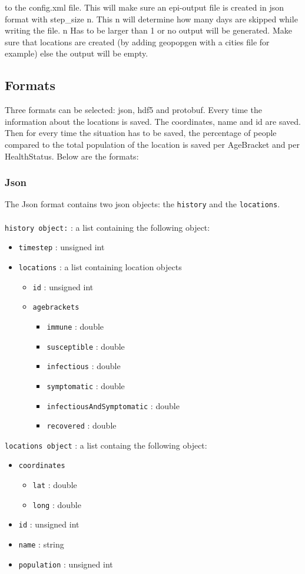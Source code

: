 to the config.xml file. This will make sure an epi-output file is created in json format with step\_size n. This n will determine how many days are skipped while writing the file. n Has to be larger than 1 or no output will be generated. Make sure that locations are created (by adding geopopgen with a cities file for example) else the output will be empty. 

\subsection{Formats}
Three formats can be selected: json, hdf5 and protobuf. Every time the information about the locations is saved. The coordinates, name and id are saved. Then for every time the situation has to be saved, the percentage of people compared to the total population of the location is saved per  AgeBracket and per HealthStatus. Below are the formats:
\subsubsection{Json}
The Json format contains two json objects: the \texttt{history} and the \texttt{locations}.
\\\\
\texttt{history object:} : a list containing the following object:
\begin{itemize}
\item \texttt{timestep} : unsigned int
\item \texttt{locations} : a list containing location objects
\begin{itemize}
\item \texttt{id} : unsigned int
\item \texttt{agebrackets}
\begin{itemize}
\item \texttt{immune} 		: double
\item \texttt{susceptible} 	: double
\item \texttt{infectious} 	: double
\item \texttt{symptomatic} 	: double
\item \texttt{infectiousAndSymptomatic} 	: double
\item \texttt{recovered} 	: double
\end{itemize}
\end{itemize}
\end{itemize}

\texttt{locations object} : a list containg the following object:
\begin{itemize}
\item \texttt{coordinates}
\begin{itemize}
\item \texttt{lat} : double
\item \texttt{long} : double
\end{itemize}
\item \texttt{id} : unsigned int
\item \texttt{name} : string
\item \texttt{population} : unsigned int
\end{itemize}

